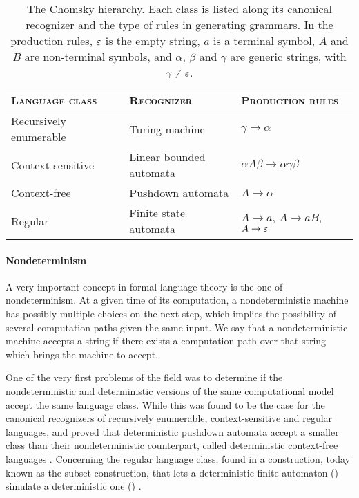 \begin{table}
	\centering
	\renewcommand{\arraystretch}{1.2}
	\begin{tabular}{lll}
		\toprule
		\textsc{Language class} & \textsc{Recognizer}          & \textsc{Production rules}          \\
		\midrule
		Recursively enumerable  & Turing machine               & $\gamma\to\alpha$                  \\
		Context-sensitive       & \makecell[lt]{Linear bounded                                      \\automata} & $\alpha A\beta\to\alpha\gamma\beta$   \\
		Context-free            & Pushdown automata            & $A\to\alpha$                       \\
		Regular                 & Finite state automata        & \makecell[lt]{$A\to a$, $A\to aB$, \\$A\to\varepsilon$} \\
		\bottomrule
	\end{tabular}
	\caption{The Chomsky hierarchy. Each class is listed along its canonical recognizer and the type of rules in generating grammars. In the production rules, $\varepsilon$ is the empty string, $a$ is a terminal symbol, $A$ and $B$ are non-terminal symbols, and $\alpha$, $\beta$ and $\gamma$ are generic strings, with $\gamma\ne\varepsilon$.}
	\label{tab:chomsky}
\end{table}

\paragraph{Nondeterminism} A very important concept in formal language theory is the one of nondeterminism.
At a given time of its computation, a nondeterministic machine has possibly multiple choices on the next step, which implies the possibility of several computation paths given the same input.
We say that a nondeterministic machine accepts a string if there exists a computation path over that string which brings the machine to accept.

One of the very first problems of the field was to determine if the nondeterministic and deterministic versions of the same computational model accept the same language class.
While this was found to be the case for the canonical recognizers of recursively enumerable, context-sensitive and regular languages, \citeauthor{Fis63} and \citeauthor{Sch63} proved that deterministic pushdown automata accept a smaller class than their nondeterministic counterpart, called deterministic context-free languages \cite{Fis63,Sch63}.
Concerning the regular language class, \citeauthor{RabSco59} found in \citeyear{RabSco59} a construction, today known as the subset construction, that lets a deterministic finite automaton (\NFA) simulate a deterministic one (\DFA) \cite{RabSco59}.

